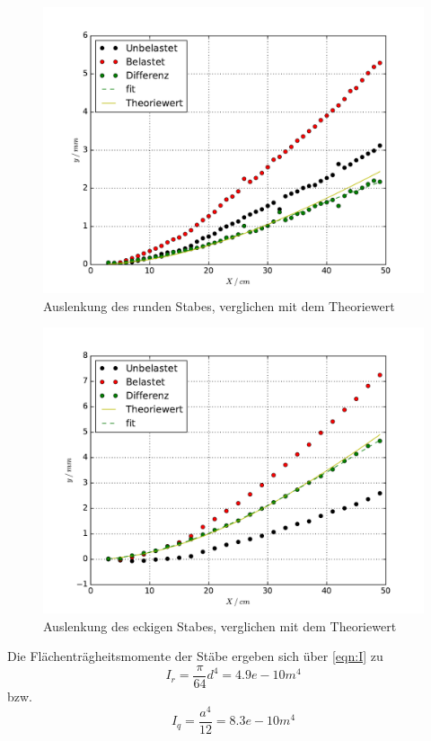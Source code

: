 \begin{figure}
  \centering
  \includegraphics[width = \textwidth]{./Plots/Reihe1.pdf}
  \caption{Auslenkung des runden Stabes, verglichen mit dem Theoriewert}
  \label{fig:Reihe1}
\end{figure}

\begin{figure}
  \centering
  \includegraphics[width = \textwidth]{./Plots/Reihe2.pdf}
  \caption{Auslenkung des eckigen Stabes, verglichen mit dem Theoriewert}
  \label{fig:Reihe2}
\end{figure}

Die Flächenträgheitsmomente der Stäbe ergeben sich über \eqref{eqn:I} zu
\begin{equation}
  I_r = \frac{\pi}{64}d^4 = 4.9e-10 m^4
\end{equation}
bzw.
\begin{equation}
  I_q = \frac{a^4}{12} = 8.3e-10 m^4
\end{equation}

